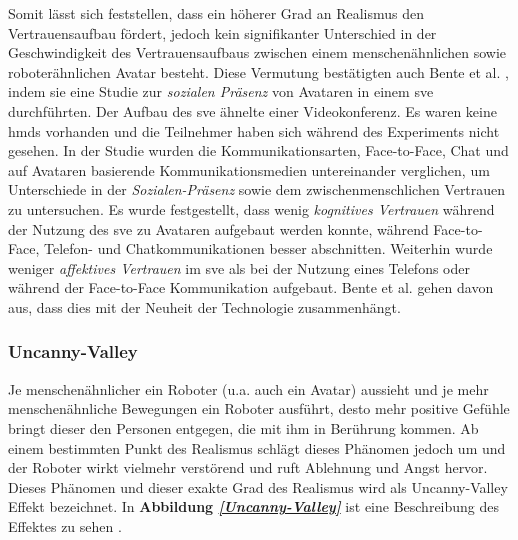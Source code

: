 \documentclass[a4paper,11pt]{article}%
\renewcommand{\\}{\vspace*{0.5\baselineskip} \newline}
\begin{document}
Somit lässt sich feststellen, dass ein höherer Grad an Realismus den Vertrauensaufbau fördert, jedoch kein signifikanter Unterschied in der Geschwindigkeit  des Vertrauensaufbaus zwischen einem menschenähnlichen sowie roboterähnlichen Avatar besteht. Diese Vermutung bestätigten auch Bente et al. \citep[S. 54-59]{bente2004social}, indem sie eine Studie zur \textit{sozialen Präsenz} von Avataren in einem \ac{sve} durchführten. Der Aufbau des \ac{sve} ähnelte einer Videokonferenz. Es waren keine \ac{hmd}s vorhanden und die Teilnehmer haben sich während des Experiments nicht gesehen. In der Studie wurden die Kommunikationsarten, Face-to-Face, Chat und auf Avataren basierende Kommunikationsmedien untereinander verglichen, um Unterschiede in der \textit{Sozialen-Präsenz} sowie dem zwischenmenschlichen Vertrauen zu untersuchen.
Es wurde festgestellt, dass wenig \textit{kognitives Vertrauen} während der Nutzung des \ac{sve} zu Avataren aufgebaut werden konnte, während Face-to-Face, Telefon- und Chatkommunikationen besser abschnitten. Weiterhin wurde weniger \textit{affektives Vertrauen} im \ac{sve} als bei der Nutzung eines Telefons oder während der Face-to-Face Kommunikation aufgebaut.
Bente et al. \citep[S. 54-59]{bente2004social} gehen davon aus, dass dies mit der Neuheit der Technologie zusammenhängt.

\subsubsection{Uncanny-Valley}
\label{Uncanny-Valley-Effekt}
Je menschenähnlicher ein Roboter (u.a. auch ein Avatar) aussieht und je mehr menschenähnliche Bewegungen ein Roboter ausführt, desto mehr positive Gefühle bringt dieser den Personen entgegen, die mit ihm in Berührung kommen. Ab einem bestimmten Punkt des Realismus schlägt dieses Phänomen jedoch um und der Roboter wirkt vielmehr verstörend und ruft  Ablehnung und Angst hervor. Dieses Phänomen und dieser exakte Grad des Realismus wird als Uncanny-Valley Effekt bezeichnet. In \textbf{Abbildung \textit{\ref{Uncanny-Valley}}} ist eine Beschreibung des Effektes zu sehen \citep[S. 352-353]{gast2011unheimliche}.
\end{document}
